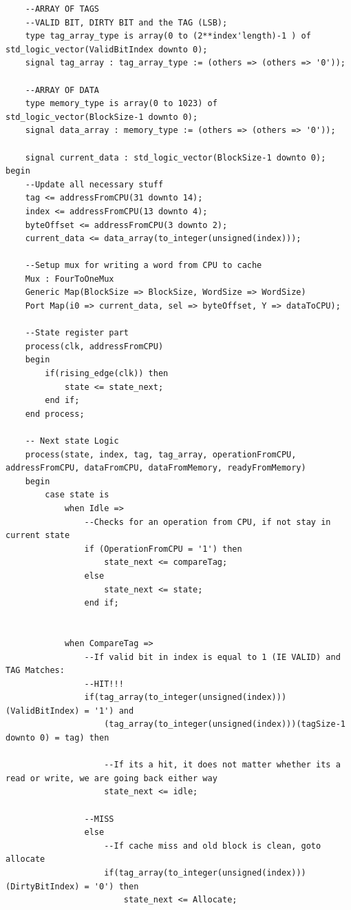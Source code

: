 \documentclass{article}
\begin{document}
\begin{lstlisting}
    --ARRAY OF TAGS 
    --VALID BIT, DIRTY BIT and the TAG (LSB);
    type tag_array_type is array(0 to (2**index'length)-1 ) of std_logic_vector(ValidBitIndex downto 0);
    signal tag_array : tag_array_type := (others => (others => '0'));

    --ARRAY OF DATA
    type memory_type is array(0 to 1023) of std_logic_vector(BlockSize-1 downto 0);
    signal data_array : memory_type := (others => (others => '0'));
    
    signal current_data : std_logic_vector(BlockSize-1 downto 0);
begin
    --Update all necessary stuff
    tag <= addressFromCPU(31 downto 14);
    index <= addressFromCPU(13 downto 4);
    byteOffset <= addressFromCPU(3 downto 2);
    current_data <= data_array(to_integer(unsigned(index)));
    
    --Setup mux for writing a word from CPU to cache
    Mux : FourToOneMux
    Generic Map(BlockSize => BlockSize, WordSize => WordSize)
    Port Map(i0 => current_data, sel => byteOffset, Y => dataToCPU);
    
    --State register part
    process(clk, addressFromCPU)
    begin
        if(rising_edge(clk)) then
            state <= state_next;
        end if;
    end process;
    
    -- Next state Logic
    process(state, index, tag, tag_array, operationFromCPU, addressFromCPU, dataFromCPU, dataFromMemory, readyFromMemory)
    begin
        case state is
            when Idle =>
                --Checks for an operation from CPU, if not stay in current state
                if (OperationFromCPU = '1') then
                    state_next <= compareTag;
                else
                    state_next <= state;
                end if;
                
                
            when CompareTag =>
                --If valid bit in index is equal to 1 (IE VALID) and TAG Matches:
                --HIT!!!
                if(tag_array(to_integer(unsigned(index)))(ValidBitIndex) = '1') and
                    (tag_array(to_integer(unsigned(index)))(tagSize-1 downto 0) = tag) then
                    
                    --If its a hit, it does not matter whether its a read or write, we are going back either way
                    state_next <= idle;
                        
                --MISS
                else                        
                    --If cache miss and old block is clean, goto allocate
                    if(tag_array(to_integer(unsigned(index)))(DirtyBitIndex) = '0') then
                        state_next <= Allocate;
                        

\end{lstlisting}
\end{document}
